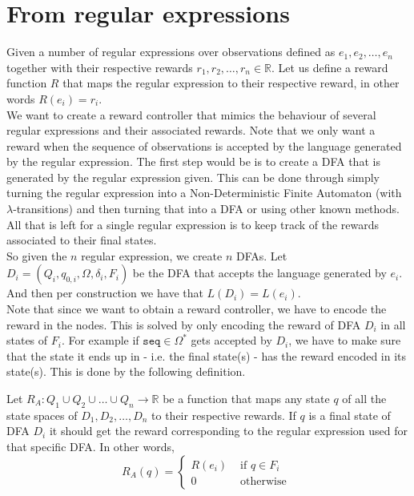 \section{From regular expressions}
\label{sec:rc-regex}
Given a number of regular expressions over observations defined as $e_1,e_2,\dots,e_n$ together with their respective rewards $r_1,r_2,\dots,r_n\in\mathbb{R}$. Let us define a reward function $R$ that maps the regular expression to their respective reward, in other words $R(e_i)=r_i$. \\

We want to create a reward controller that mimics the behaviour of several regular expressions and their associated rewards. Note that we only want a reward when the sequence of observations is accepted by the language generated by the regular expression. The first step would be is to create a DFA that is generated by the regular expression given. This can be done through simply turning the regular expression into a Non-Deterministic Finite Automaton (with $\lambda$-transitions) and then turning that into a DFA or using other known methods\cite{p:regex-to-dfa}. All that is left for a single regular expression is to keep track of the rewards associated to their final states.\\

So given the $n$ regular expression, we create $n$ DFAs. Let $D_i=(Q_i,q_{0,i},\Omega, \delta_i,F_i)$ be the DFA that accepts the language generated by $e_i$. And then per construction we have that $L(D_i)=L(e_i)$. \\

Note that since we want to obtain a reward controller, we have to encode the reward in the nodes. This is solved by only encoding the reward of DFA $D_i$ in all states of $F_i$. For example if $\texttt{seq}\in\Omega^*$ gets accepted by $D_i$, we have to make sure that the state it ends up in - i.e. the final state(s) - has the reward encoded in its state(s). This is done by the following definition.
\begin{definition}
Let $R_A:Q_1\cup Q_2\cup\dots\cup Q_n\to\mathbb{R}$ be a function that maps any state $q$ of all the state spaces of $D_1,D_2,\dots,D_n$ to their respective rewards. If $q$ is a final state of DFA $D_i$ it should get the reward corresponding to the regular expression used for that specific DFA. In other words,
\begin{equation*}
R_A(q) = \begin{cases}
R(e_i) & \text{ if } q\in F_i \\
0 & \text{ otherwise }
\end{cases}
\end{equation*}
\label{d:associated_reward}
\end{definition}

